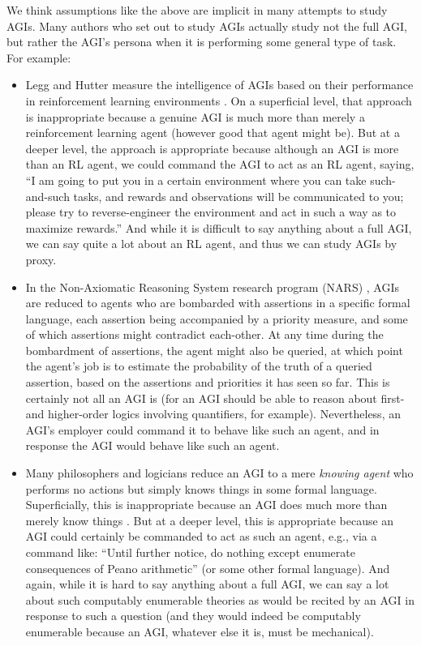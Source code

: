 \documentclass{article}
\begin{document}
We think assumptions like the above are implicit in many attempts to study AGIs.
Many authors who set out to study
AGIs actually study not the full AGI, but rather the AGI's persona when it is
performing some general type of task. For example:
\begin{itemize}
    \item
    Legg and Hutter measure the intelligence of AGIs based on their performance
    in reinforcement learning environments \cite{legg}. On a superficial
    level, that approach is inappropriate because a genuine AGI is much more than
    merely a reinforcement learning agent (however good that agent might be).
    But at a deeper level, the approach is appropriate because although an AGI is
    more than an RL agent, we could command the AGI to act as an RL agent, saying,
    ``I am going to put you in a certain environment where you can take such-and-such
    tasks, and rewards and observations will be communicated to you; please try to
    reverse-engineer the environment and act in such a way as to maximize rewards.''
    And while it is difficult to say anything about a full AGI, we can say quite a
    lot about an RL agent, and thus we can study AGIs by proxy.
    \item
    In the Non-Axiomatic Reasoning System research program (NARS) \cite{nars},
    AGIs are reduced to agents who are bombarded with assertions in a specific formal
    language, each assertion being accompanied by a priority measure, and some of
    which assertions might contradict each-other. At any time during the bombardment
    of assertions, the agent might also be queried, at which point the agent's job is
    to estimate the probability of the truth of a queried assertion, based on the
    assertions and priorities it has seen so far. This is certainly not all an AGI
    is (for an AGI should be able to reason about first- and higher-order logics
    involving quantifiers, for example). Nevertheless, an AGI's employer could command
    it to behave like such an agent, and in response the AGI would behave like such an
    agent.
    \item
    Many philosophers and logicians reduce an AGI to a mere \emph{knowing
    agent} who performs no actions but simply knows things in some formal language.
    Superficially, this is inappropriate because an AGI does much more than merely
    know things \cite{wang2007three}. But at a deeper level, this is appropriate
    because an AGI could certainly be commanded to act as such an agent, e.g., via 
    a command like: ``Until further notice, do nothing except enumerate consequences
    of Peano arithmetic'' (or some other formal language). And again, while it is
    hard to say anything about a full AGI, we can say a lot about such computably
    enumerable theories as would be recited by an AGI in response to such a question
    (and they would indeed be computably enumerable because an AGI, whatever else it
    is, must be mechanical).
\end{itemize}
\end{document}
